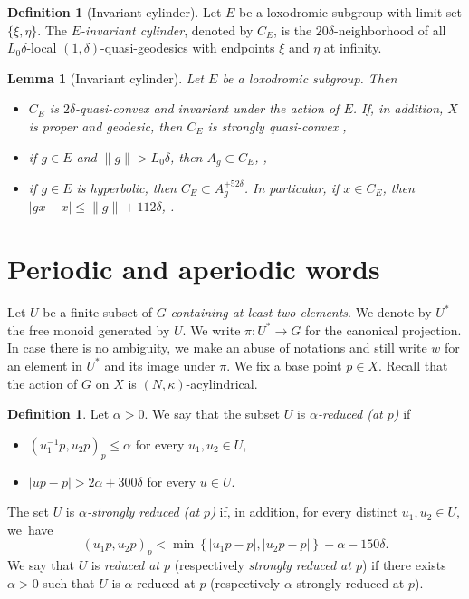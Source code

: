 \documentclass[JEP,XML,SOM,Unicode, NoEqCountersInSection,published]{cedram}
\theoremstyle{plain}
\newtheorem{lem}[thm]{Lemma}
\theoremstyle{definition}
\newtheorem{df}[thm]{Definition}
\begin{document}
\begin{df}[Invariant cylinder] Let $E$ be a loxodromic subgroup with limit set $\{ \xi,\eta \}$. The \emph{$E$-invariant cylinder}, denoted by $C_E$, is the $20\delta$-neighborhood of all $L_0 \delta$-local $(1, \delta)$-quasi-geodesics with endpoints $\xi$ and $\eta$ at infinity.
\end{df}

\begin{lem}[Invariant cylinder]\label{L: invariant cylinder}
Let $E$ be a loxodromic subgroup. Then
\begin{itemize}
\item $C_E$ is $2\delta$-quasi-convex and invariant under the action of $E$. If, in addition, $X$ is proper and geodesic, then $C_E$ is strongly quasi-convex \cite[Lem.\,2.31]{coulon_geometry_2014},

\item if $g\in E$ and $\| g \|>L_0\delta$, then $A_g\subset C_E$, \cite[Lem.\,2.33]{coulon_geometry_2014},

\item if $g\in E$ is hyperbolic, then $C_E\subset A_g^{+ 52\delta}$. In particular, if $x\in C_E$, then $|gx-x|\leqslant \| g \| + 112 \delta $, \cite[Lem.\,2.32]{coulon_geometry_2014}.

\end{itemize}
\end{lem}

\section{Periodic and aperiodic words}
\label{sec: periodic and aperiodic words}
Let $U$ be a finite subset of $G$ \emph{containing at least two elements}.
We denote by $U^*$ the free monoid generated by $U$.
We write $\pi \colon U^* \to G$ for the canonical projection.
In case there is no ambiguity, we make an abuse of notations and still write $w$ for an element in $U^*$ and its image under $\pi$.
We fix a base point $p \in X$.
Recall that the action of $G$ on $X$ is $(N,\kappa)$-acylindrical.

\begin{df}
\label{def: reduced set}
Let $\alpha > 0$.
We say that the subset $U$ is \emph{$\alpha$-reduced (at $p$)} if
\begin{itemize}
\item $(u_1^{-1}p, u_2p)_p \leqslant \alpha$ for every $u_1, u_2 \in U$,
\item $|up - p| > 2\alpha + 300\delta$ for every $u \in U$.
\end{itemize}
The set $U$ is \emph{$\alpha$-strongly reduced (at $p$)} if, in addition, for every distinct $u_1, u_2 \in U$, we~have
\begin{equation*}
(u_1p,u_2p)_p < \min \left\{ |u_1p - p|, |u_2p - p|\right\} -\alpha - 150\delta.
\end{equation*}
We say that $U$ is \emph{reduced at $p$} (respectively \emph{strongly reduced at $p$}) if there exists $\alpha > 0$ such that $U$ is $\alpha$-reduced at $p$ (respectively $\alpha$-strongly reduced at $p$).
\end{df}
\end{document}
